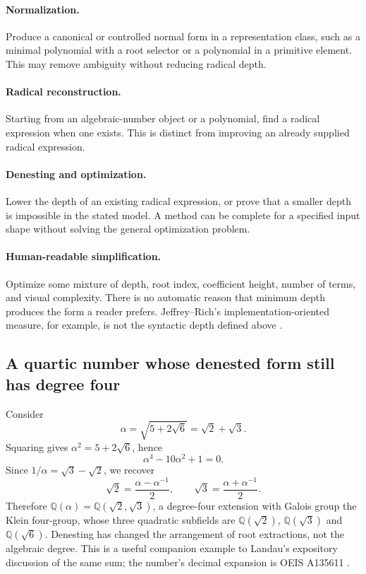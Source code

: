 \documentclass[11pt,oneside]{article}
\numberwithin{equation}{section}
\theoremstyle{definition}
\theoremstyle{remark}
\newcommand{\Q}{\mathbb{Q}}
\begin{document}
\paragraph{Normalization.} Produce a canonical or controlled normal form in a representation class, such as a minimal polynomial with a root selector or a polynomial in a primitive element. This may remove ambiguity without reducing radical depth.

\paragraph{Radical reconstruction.} Starting from an algebraic-number object or a polynomial, find a radical expression when one exists. This is distinct from improving an already supplied radical expression.

\paragraph{Denesting and optimization.} Lower the depth of an existing radical expression, or prove that a smaller depth is impossible in the stated model. A method can be complete for a specified input shape without solving the general optimization problem.

\paragraph{Human-readable simplification.} Optimize some mixture of depth, root index, coefficient height, number of terms, and visual complexity. There is no automatic reason that minimum depth produces the form a reader prefers. Jeffrey--Rich's implementation-oriented measure, for example, is not the syntactic depth defined above \cite{jeffrey}.

\subsection{A quartic number whose denested form still has degree four}
Consider
\begin{equation}\label{eq:quarticexample}
\alpha=\sqrt{5+2\sqrt6}=\sqrt2+\sqrt3.
\end{equation}
Squaring gives $\alpha^2=5+2\sqrt6$, hence
\[
\alpha^4-10\alpha^2+1=0.
\]
Since $1/\alpha=\sqrt3-\sqrt2$, we recover
\[
\sqrt2=\frac{\alpha-\alpha^{-1}}2,
\qquad \sqrt3=\frac{\alpha+\alpha^{-1}}2.
\]
Therefore $\Q(\alpha)=\Q(\sqrt2,\sqrt3)$, a degree-four extension with Galois group the Klein four-group, whose three quadratic subfields are $\Q(\sqrt2)$, $\Q(\sqrt3)$ and $\Q(\sqrt6)$. Denesting has changed the arrangement of root extractions, not the algebraic degree. This is a useful companion example to Landau's expository discussion of the same sum; the number's decimal expansion is OEIS A135611 \cite{landauviews,oeis}.
\end{document}
